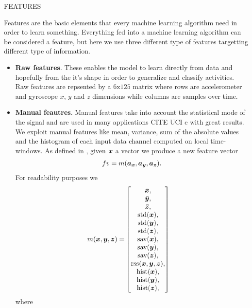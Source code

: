 FEATURES

Features are the basic elements that every machine learning algorithm
need in order to learn something. Everything fed into a machine
learning algorithm can be considered a feature, but here we use three different type of features targetting different type of information.

\begin{itemize}
\item \textbf{Raw features}. These enables the model to
  learn directly from data and hopefully from the it's shape in order
  to generalize and classify activities. Raw features are repsented by
  a $6 \text{x} 125$ matrix where rows are accelerometer and gyroscope
  $x$, $y$ and $z$ dimensions while columns are samples over time.
\item \textbf{Manual feautres}. Manual features take into account the
  statistical mode of the signal and are used in many applications
  CITE UCI e \cite{ignatov2018real} with great results. We exploit
  manual features like mean, variance, sum of the absolute values and
  the histogram of each input data channel computed on local
  time-windows. As defined in \cite{ignatov2018real}, given $\boldsymbol{x}$ a
  vector we produce a new feature vector
  \begin{align}
    fv = m(\boldsymbol{a}_{\boldsymbol{x}}, \boldsymbol{a}_{\boldsymbol{y}}, \boldsymbol{a}_{\boldsymbol{z}}).
  \end{align}
  For readability purposes we
  \begin{align}
    m(\boldsymbol{x}, \boldsymbol{y}, \boldsymbol{z}) &= \begin{bmatrix}
      \bar{\boldsymbol{x}}, \\
      \bar{\boldsymbol{y}}, \\
      \bar{\boldsymbol{z}}, \\
      \text{std}(\boldsymbol{x}), \\
      \text{std}(\boldsymbol{y}), \\
      \text{std}(\boldsymbol{z}), \\
      \text{sav}(\boldsymbol{x}), \\
      \text{sav}(\boldsymbol{y}), \\
      \text{sav}(\boldsymbol{z}), \\
      \text{rss}(\boldsymbol{x}, \boldsymbol{y}, \boldsymbol{z}), \\
      \text{hist}(\boldsymbol{x}), \\
      \text{hist}(\boldsymbol{y}), \\
      \text{hist}(\boldsymbol{z}), \\
    \end{bmatrix}
  \end{align}
  where
  \begin{align}

\end{align}
\end{itemize}
